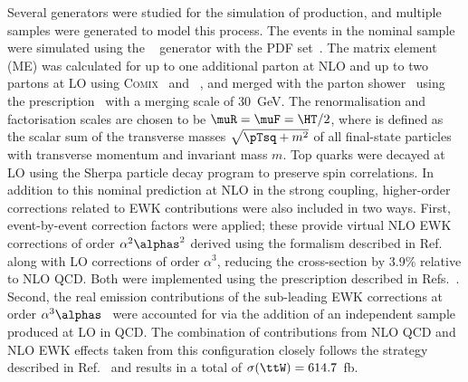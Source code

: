 \documentclass[cernpreprint, atlasdraft=false, texlive=2023, UKenglish, texmf, orcidlogo]{atlasdoc}
\begin{document}
 
Several generators were studied for the simulation of \ttW
production, and multiple samples were generated to model this
process. The events in the nominal \ttW sample were simulated using
the \Sherpa[2.2.10]~\cite{Bothmann:2019yzt,Gleisberg:2008ta} generator
with the \NNPDF[3.0nnlo] PDF set~\cite{Ball:2014uwa}.  The matrix
element (ME) was calculated for up to one additional parton at NLO and
up to two partons at LO using \textsc{Comix}~\cite{Gleisberg:2008fv}
and \OPENLOOPS~\cite{Cascioli:2011va,Denner:2016kdg,Buccioni:2019sur}, and merged with the \Sherpa
parton shower~\cite{Schumann:2007mg} using the \MEPSatNLO
prescription~\cite{Hoeche:2012yf} with a merging scale of 30~GeV. The
renormalisation and factorisation scales are chosen to be $\muR = \muF =
\HT/2$, where \HT is defined as the scalar sum of
the transverse masses $\sqrt{\pTsq+m^2}$ of all final-state
particles with transverse momentum \pT and invariant mass $m$.
Top quarks were decayed at LO using the Sherpa particle decay program to preserve spin correlations.
In addition to this nominal prediction at NLO in the
strong coupling, higher-order corrections related to EWK
contributions were also included in two ways.  First,
event-by-event correction factors were applied; these provide virtual NLO
EWK corrections of order $\alpha^{2}\alphas^{2}$ derived using the
formalism described in Ref.~\cite{Kallweit:2015dum} along with LO
corrections of order $\alpha^3$, reducing the cross-section by 3.9\% relative to NLO QCD.
Both were implemented using the prescription described in
Refs.~\cite{Bothmann:2019yzt,Gutschow:2018tuk}. Second, the real emission contributions of the sub-leading EWK
corrections at order $\alpha^{3}\alphas$~\cite{Frederix:2017wme} were accounted for via the
addition of an independent \Sherpa[2.2.10] sample produced at LO in
QCD.
The combination of contributions from NLO QCD and NLO EWK effects taken
from this \Sherpa configuration closely follows the
strategy described in Ref.~\cite{Frederix:2021agh} and results in a total \xs of $\sigma(\ttW) = 614.7$~fb.
 
 
 
\end{document}
